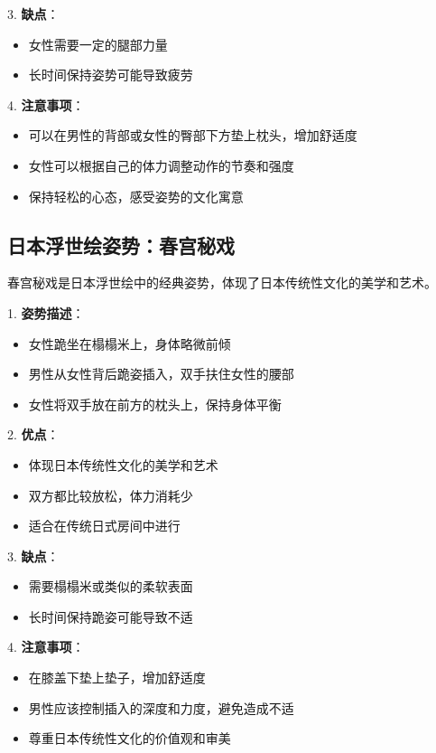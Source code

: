 \documentclass[12pt,UTF8]{ctexbook}
\begin{document}
3. \textbf{缺点}：
  \begin{itemize}
  \item 女性需要一定的腿部力量
  \item 长时间保持姿势可能导致疲劳
  \end{itemize}

4. \textbf{注意事项}：
  \begin{itemize}
  \item 可以在男性的背部或女性的臀部下方垫上枕头，增加舒适度
  \item 女性可以根据自己的体力调整动作的节奏和强度
  \item 保持轻松的心态，感受姿势的文化寓意
  \end{itemize}

\subsection{日本浮世绘姿势：春宫秘戏}

春宫秘戏是日本浮世绘中的经典姿势，体现了日本传统性文化的美学和艺术。

1. \textbf{姿势描述}：
  \begin{itemize}
  \item 女性跪坐在榻榻米上，身体略微前倾
  \item 男性从女性背后跪姿插入，双手扶住女性的腰部
  \item 女性将双手放在前方的枕头上，保持身体平衡
  \end{itemize}

2. \textbf{优点}：
  \begin{itemize}
  \item 体现日本传统性文化的美学和艺术
  \item 双方都比较放松，体力消耗少
  \item 适合在传统日式房间中进行
  \end{itemize}

3. \textbf{缺点}：
  \begin{itemize}
  \item 需要榻榻米或类似的柔软表面
  \item 长时间保持跪姿可能导致不适
  \end{itemize}

4. \textbf{注意事项}：
  \begin{itemize}
  \item 在膝盖下垫上垫子，增加舒适度
  \item 男性应该控制插入的深度和力度，避免造成不适
  \item 尊重日本传统性文化的价值观和审美
  \end{itemize}
\end{document}
